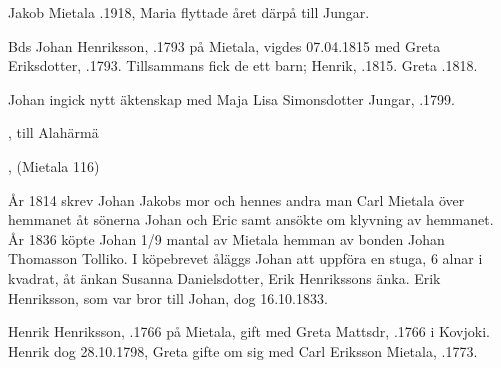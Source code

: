 Jakob Mietala .1918, Maria flyttade året därpå till Jungar.


Bds Johan Henriksson, .1793 på Mietala, vigdes 07.04.1815 med Greta Eriksdotter, .1793. Tillsammans fick de ett barn; Henrik, .1815.
Greta .1818.

Johan ingick nytt äktenskap med Maja Lisa Simonsdotter Jungar, .1799.
\begin{jhchildren}
  \item {}
  \item {}
  \item {}
  \item {}
  \item {}
  \item {}, till Alahärmä
  \item {}, (Mietala 116)
  \item {}
\end{jhchildren}

År 1814 skrev Johan Jakobs mor och hennes andra man Carl Mietala över hemmanet åt sönerna Johan och Eric samt ansökte om klyvning av hemmanet. År 1836 köpte Johan 1/9 mantal av Mietala hemman av bonden Johan Thomasson Tolliko. I köpebrevet åläggs Johan att uppföra en stuga, 6 alnar i kvadrat, åt änkan Susanna Danielsdotter, Erik Henrikssons änka. Erik Henriksson, som var bror till Johan, dog 16.10.1833.


Henrik Henriksson, .1766 på Mietala, gift med Greta Mattsdr, .1766 i Kovjoki. Henrik dog 28.10.1798, Greta gifte om sig med Carl Eriksson Mietala, .1773.
\begin{jhchildren}
  \item {}
  \item {}
  \item {}
  \item {}
  \item {}
  \item {}
  \item {}
\end{jhchildren}


